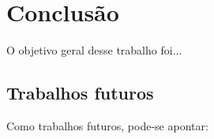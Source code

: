 \chapter{Conclusão}
\label{conclusão}
O objetivo geral desse trabalho foi...


 \section{Trabalhos futuros}
Como trabalhos futuros, pode-se apontar:
  
